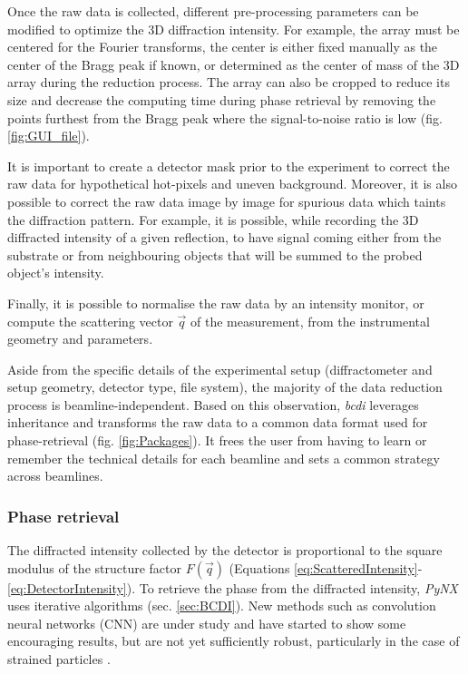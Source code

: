 Once the raw data is collected, different pre-processing parameters can be modified to optimize the 3D diffraction intensity.
For example, the array must be centered for the Fourier transforms, the center is either fixed manually as the center of the Bragg peak if known, or determined as the center of mass of the 3D array during the reduction process.
The array can also be cropped to reduce its size and decrease the computing time during phase retrieval by removing the points furthest from the Bragg peak where the signal-to-noise ratio is low (fig. \ref{fig:GUI_file}).

It is important to create a detector mask prior to the experiment to correct the raw data for hypothetical hot-pixels and uneven background.
Moreover, it is also possible to correct the raw data image by image for spurious data which taints the diffraction pattern.
For example, it is possible, while recording the 3D diffracted intensity of a given reflection, to have signal coming either from the substrate or from neighbouring objects that will be summed to the probed object's intensity.

Finally, it is possible to normalise the raw data by an intensity monitor, or compute the scattering vector $\vec{q}$ of the measurement, from the instrumental geometry and parameters.

Aside from the specific details of the experimental setup (diffractometer and setup geometry, detector type, file system), the majority of the data reduction process is beamline-independent.
Based on this observation, \textit{bcdi} leverages inheritance and transforms the raw data to a common data format used for phase-retrieval (fig. \ref{fig:Packages}).
It frees the user from having to learn or remember the technical details for each beamline and sets a common strategy across beamlines.

\subsubsection{Phase retrieval} \label{sec:phaseretrievalpynx}

The diffracted intensity collected by the detector is proportional to the square modulus of the structure factor $F(\vec{q})$ (Equations \ref{eq:ScatteredIntensity}-\ref{eq:DetectorIntensity}).
To retrieve the phase from the diffracted intensity, \textit{PyNX} uses iterative algorithms (sec. \ref{sec:BCDI}).
New methods such as convolution neural networks (CNN) are under study and have started to show some encouraging results, but are not yet sufficiently robust, particularly in the case of strained particles \parencite{cherukara_real-time_2018,chan_rapid_2021,Wu2021a}.

